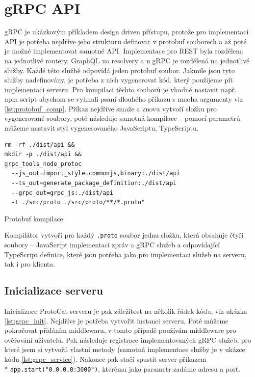 \documentclass[thesis=M,czech]{FITthesis}[2019/12/23]
\begin{document}
\section{gRPC API}
gRPC je ukázkovým příkladem design driven přístupu, protože pro implementaci API je potřeba nejdříve jeho strukturu definovat v protobuf souborech a až poté je možné implementovat samotné API. Implementace pro REST byla rozdělena na jednotlivé routery, GraphQL na resolvery a u gRPC je rozdělená na jednotlivé služby. Každé této službě odpovídá jeden protobuf soubor. Jakmile jsou tyto služby nadefinovány, je potřeba z nich vygenerovat kód, který použijeme při implementaci serveru. Pro kompilaci těchto souborů je vhodné nastavit např. npm script abychom se vyhnuli psaní dlouhého příkazu s mnoha argumenty viz \ref{lst:protobuf_comp}. Příkaz nejdříve smaže a znovu vytvoří složku pro vygenerované soubory, poté následuje samotná kompilace -- pomocí parametrů můžeme nastavit styl vygenerovaného JavaScriptu, TypeScriptu.

\begin{listing}[H]
\begin{verbatim}
rm -rf ./dist/api &&
mkdir -p ./dist/api &&
grpc_tools_node_protoc 
  --js_out=import_style=commonjs,binary:./dist/api
  --ts_out=generate_package_definition:./dist/api
  --grpc_out=grpc_js:./dist/api
  -I ./src/proto ./src/proto/**/*.proto"
\end{verbatim}
\caption{Protobuf kompilace}
\label{lst:protobuf_comp}
\end{listing}


Kompilátor vytvoří pro každý \texttt{.proto} soubor jednu složku, která obsahuje čtyři soubory -- JavaScript implementaci zpráv a gRPC služeb a odpovídající TypeScript definice, které jsou potřeba jako pro implementaci služeb na serveru, tak i pro klienta.


\subsection{Inicializace serveru}
Inicializace ProtoCat serveru je pak záležitost na několik řádek kódu, viz ukázka \ref{lst:grpc_init}. Nejdříve je potřeba vytvořit instanci serveru. 
Poté můžeme pokračovat přidáním middlewaru, v tomto případě používám middleware pro ověřování uživatelů. Pak následuje registrace implementovaných gRPC služeb, pro které jsem si vytvořil vlastní metody (samotná implementace služby je v ukázce kódu \ref{lst:grpc_service}). Nakonec pak stačí spustit server příkazem \\* \texttt{app.start("0.0.0.0:3000")}, kterému jako parametr zadáme adresu a port.
\end{document}
